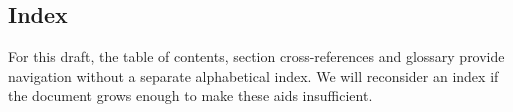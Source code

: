 \subsection{Index}
\label{sec:index}
\begin{notapplicable}
For this draft, the table of contents, section cross-references and glossary
provide navigation without a separate alphabetical index. We will reconsider an index
if the document grows enough to make these aids insufficient.
\end{notapplicable}
